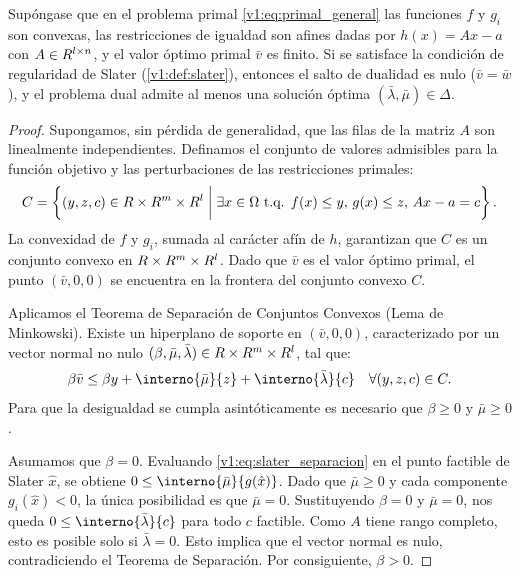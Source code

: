 \begin{theorem}\label{v1:thm:dualidad_fuerte_slater}
    Supóngase que en el problema primal \eqref{v1:eq:primal_general} las funciones $f$ y $g_i$ son convexas, las restricciones de igualdad son afines dadas por $h(x) = Ax - a$ con $A \in R^{l \times n}$, y el valor óptimo primal $\bar{v}$ es finito. Si se satisface la condición de regularidad de Slater (\cref{v1:def:slater}), entonces el salto de dualidad es nulo ($\bar{v} = \bar{w}$), y el problema dual admite al menos una solución óptima $(\bar{\lambda}, \bar{\mu}) \in \Delta$.
\end{theorem}

\begin{proof}
    Supongamos, sin pérdida de generalidad, que las filas de la matriz $A$ son linealmente independientes. Definamos el conjunto de valores admisibles para la función objetivo y las perturbaciones de las restricciones primales:
    \[
        C = \left\{ (y, z, c) \in R \times R^m \times R^l \mathrel{\bigg|} \exists x \in \Omega \text{ t.q. } f(x) \le y, \, g(x) \le z, \, Ax - a = c \right\}.
    \]
    La convexidad de $f$ y $g_i$, sumada al carácter afín de $h$, garantizan que $C$ es un conjunto convexo en $R \times R^m \times R^l$. Dado que $\bar{v}$ es el valor óptimo primal, el punto $(\bar{v}, 0, 0)$ se encuentra en la frontera del conjunto convexo $C$.
    
    Aplicamos el Teorema de Separación de Conjuntos Convexos (Lema de Minkowski). Existe un hiperplano de soporte en $(\bar{v}, 0, 0)$, caracterizado por un vector normal no nulo $(\beta, \bar{\mu}, \bar{\lambda}) \in R \times R^m \times R^l$, tal que:
    \begin{equation}
        \beta \bar{v} \le \beta y + \interno{\bar{\mu}}{z} + \interno{\bar{\lambda}}{c} \quad \forall (y, z, c) \in C.
        \label{v1:eq:slater_separacion}
    \end{equation}
    Para que la desigualdad se cumpla asintóticamente es necesario que $\beta \ge 0$ y $\bar{\mu} \ge 0$.
    
    Asumamos que $\beta = 0$. Evaluando \eqref{v1:eq:slater_separacion} en el punto factible de Slater $\hat{x}$, se obtiene $0 \le \interno{\bar{\mu}}{g(\hat{x})}$. Dado que $\bar{\mu} \ge 0$ y cada componente $g_i(\hat{x}) < 0$, la única posibilidad es que $\bar{\mu} = 0$. Sustituyendo $\beta = 0$ y $\bar{\mu} = 0$, nos queda $0 \le \interno{\bar{\lambda}}{c}$ para todo $c$ factible. Como $A$ tiene rango completo, esto es posible solo si $\bar{\lambda} = 0$. Esto implica que el vector normal es nulo, contradiciendo el Teorema de Separación. Por consiguiente, $\beta > 0$.
    

\end{proof}
